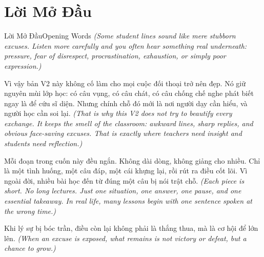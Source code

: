 \chapter*{Lời Mở Đầu}

\begin{truyen}{Lời Mở Đầu}{Opening Words}
\textit{(Some student lines sound like mere stubborn excuses. Listen more carefully and you often hear something real underneath: pressure, fear of disrespect, procrastination, exhaustion, or simply poor expression.)}

Vì vậy bản V2 này không cố làm cho mọi cuộc đối thoại trở nên đẹp. Nó giữ nguyên mùi lớp học: có câu vụng, có câu chát, có câu chống chế nghe phát biết ngay là để cứu sĩ diện. Nhưng chính chỗ đó mới là nơi người dạy cần hiểu, và người học cần soi lại.
\textit{(That is why this V2 does not try to beautify every exchange. It keeps the smell of the classroom: awkward lines, sharp replies, and obvious face-saving excuses. That is exactly where teachers need insight and students need reflection.)}

Mỗi đoạn trong cuốn này đều ngắn. Không dài dòng, không giảng cho nhiều. Chỉ là một tình huống, một câu đáp, một cái khựng lại, rồi rút ra điều cốt lõi. Vì ngoài đời, nhiều bài học đến từ đúng một câu bị nói trật chỗ.
\textit{(Each piece is short. No long lectures. Just one situation, one answer, one pause, and one essential takeaway. In real life, many lessons begin with one sentence spoken at the wrong time.)}
\end{truyen}

\begin{baihoc}
Khi lý sự bị bóc trần, điều còn lại không phải là thắng thua, mà là cơ hội để lớn lên.
\textit{(When an excuse is exposed, what remains is not victory or defeat, but a chance to grow.)}
\end{baihoc}
\ngancach